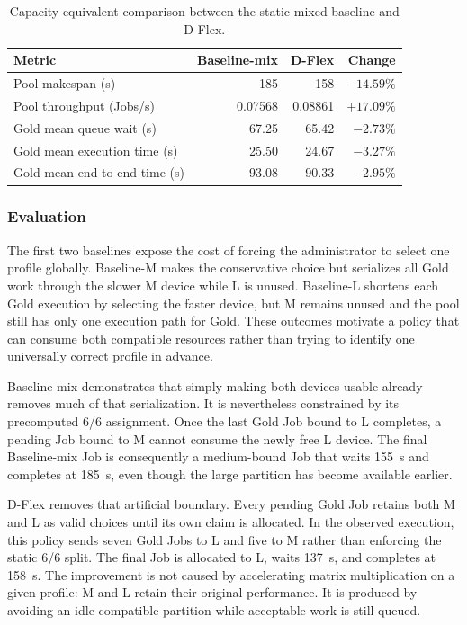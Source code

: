 \begin{table}[htbp]
    \centering
    \small
    \caption{Capacity-equivalent comparison between the static mixed baseline and D-Flex.}
    \label{tab:kueue-main-comparison}
    \begin{tabular}{lrrr}
        \toprule
        \textbf{Metric} & \textbf{Baseline-mix} & \textbf{D-Flex} & \textbf{Change} \\
        \midrule
        Pool makespan (s) & 185 & 158 & $-14.59\%$ \\
        Pool throughput (Jobs/s) & 0.07568 & 0.08861 & $+17.09\%$ \\
        Gold mean queue wait (s) & 67.25 & 65.42 & $-2.73\%$ \\
        Gold mean execution time (s) & 25.50 & 24.67 & $-3.27\%$ \\
        Gold mean end-to-end time (s) & 93.08 & 90.33 & $-2.95\%$ \\
        \bottomrule
    \end{tabular}
\end{table}

\subsubsection{Evaluation}

The first two baselines expose the cost of forcing the administrator to select one profile globally. Baseline-M makes the conservative choice but serializes all Gold work through the slower M device while L is unused. Baseline-L shortens each Gold execution by selecting the faster device, but M remains unused and the pool still has only one execution path for Gold. These outcomes motivate a policy that can consume both compatible resources rather than trying to identify one universally correct profile in advance.

Baseline-mix demonstrates that simply making both devices usable already removes much of that serialization. It is nevertheless constrained by its precomputed 6/6 assignment. Once the last Gold Job bound to L completes, a pending Job bound to M cannot consume the newly free L device. The final Baseline-mix Job is consequently a medium-bound Job that waits 155~s and completes at 185~s, even though the large partition has become available earlier.

D-Flex removes that artificial boundary. Every pending Gold Job retains both M and L as valid choices until its own claim is allocated. In the observed execution, this policy sends seven Gold Jobs to L and five to M rather than enforcing the static 6/6 split. The final Job is allocated to L, waits 137~s, and completes at 158~s. The improvement is not caused by accelerating matrix multiplication on a given profile: M and L retain their original performance. It is produced by avoiding an idle compatible partition while acceptable work is still queued.

